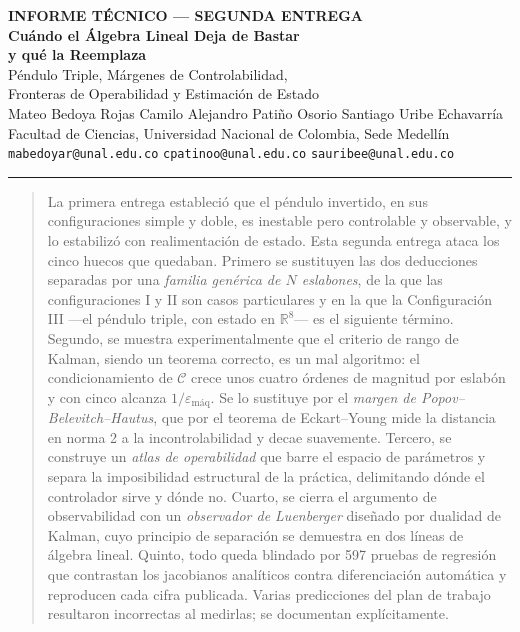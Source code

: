 \documentclass[11pt,letterpaper]{article}
\theoremstyle{definition}
\theoremstyle{plain}
\theoremstyle{remark}
\newcommand{\R}{\mathbb{R}}
\newcommand{\calC}{\mathcal{C}}
\begin{document}
\begin{center}
    {\footnotesize\bfseries\color{acento2} INFORME TÉCNICO --- SEGUNDA ENTREGA}\\[0.4em]
    {\LARGE\bfseries Cuándo el Álgebra Lineal Deja de Bastar \\[0.2em]
     y qué la Reemplaza}\\[0.5em]
    {\large Péndulo Triple, Márgenes de Controlabilidad, \\ Fronteras de Operabilidad y Estimación de Estado}\\[1.2em]
    {\normalsize Mateo Bedoya Rojas \quad\textbullet\quad Camilo Alejandro Patiño Osorio \quad\textbullet\quad Santiago Uribe Echavarría}\\[0.5em]
    {\footnotesize
    Facultad de Ciencias, Universidad Nacional de Colombia, Sede Medellín \\ \texttt{mabedoyar@unal.edu.co} \quad \texttt{cpatinoo@unal.edu.co} \quad \texttt{sauribee@unal.edu.co}}\\[0.8em]
\end{center}
\vspace{0.4em}
\hrule height 0.6pt
\vspace{1.0em}

\begin{abstract}
\noindent
La primera entrega estableció que el péndulo invertido, en sus configuraciones
simple y doble, es inestable pero controlable y observable, y lo estabilizó con
realimentación de estado. Esta segunda entrega ataca los cinco huecos que
quedaban. Primero se sustituyen las dos deducciones separadas por una
\emph{familia genérica de $N$ eslabones}, de la que las configuraciones I y II
son casos particulares y en la que la Configuración III ---el péndulo triple,
con estado en $\R^8$--- es el siguiente término. Segundo, se muestra
experimentalmente que el criterio de rango de Kalman, siendo un teorema
correcto, es un mal algoritmo: el condicionamiento de $\calC$ crece unos cuatro
órdenes de magnitud por eslabón y con cinco alcanza $1/\varepsilon_{\text{máq}}$.
Se lo sustituye por el \emph{margen de Popov--Belevitch--Hautus}, que por el
teorema de Eckart--Young mide la distancia en norma 2 a la incontrolabilidad y
decae suavemente. Tercero, se construye un \emph{atlas de operabilidad} que
barre el espacio de parámetros y separa la imposibilidad estructural de la
práctica, delimitando dónde el controlador sirve y dónde no. Cuarto, se cierra
el argumento de observabilidad con un \emph{observador de Luenberger} diseñado
por dualidad de Kalman, cuyo principio de separación se demuestra en dos líneas
de álgebra lineal. Quinto, todo queda blindado por 597 pruebas de regresión que
contrastan los jacobianos analíticos contra diferenciación automática y
reproducen cada cifra publicada. Varias predicciones del plan de trabajo
resultaron incorrectas al medirlas; se documentan explícitamente.
\end{abstract}
\end{document}

